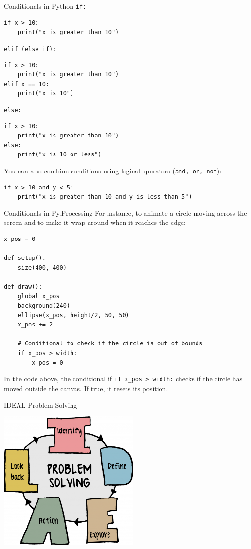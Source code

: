 \documentclass[10pt]{beamer}
\begin{document}

\begin{frame}[fragile]{Conditionals in Python}
\texttt{if:}
\begin{lstlisting}
if x > 10:
    print("x is greater than 10")
\end{lstlisting}

\texttt{elif (else if):}
\begin{lstlisting}
if x > 10:
    print("x is greater than 10")
elif x == 10:
    print("x is 10")
\end{lstlisting}

\texttt{else:}
\begin{lstlisting}
if x > 10:
    print("x is greater than 10")
else:
    print("x is 10 or less")
\end{lstlisting}

You can also combine conditions using logical operators (\texttt{and, or, not}):
\begin{lstlisting}
if x > 10 and y < 5:
    print("x is greater than 10 and y is less than 5")
\end{lstlisting}
\end{frame}

\begin{frame}[fragile]{Conditionals in Py.Processing}
For instance, to animate a circle moving across the screen and to make it wrap around when it reaches the edge:
\begin{lstlisting}
x_pos = 0

def setup():
    size(400, 400)

def draw():
    global x_pos
    background(240)
    ellipse(x_pos, height/2, 50, 50)
    x_pos += 2

    # Conditional to check if the circle is out of bounds
    if x_pos > width:
        x_pos = 0
\end{lstlisting}

In the code above, the conditional if \texttt{if x\_pos > width:} checks if the circle has moved outside the canvas. If true, it resets its position.
\end{frame}


\begin{frame}{IDEAL Problem Solving}
\begin{center}
    	 \includegraphics[height=7cm]{images/ideal_ps}
\end{center}
\end{frame}
\end{document}

